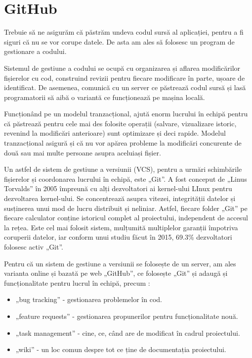 \section{GitHub}
	Trebuie să ne asigurăm că păstrăm undeva codul sursă al aplicației, pentru a fi siguri că nu se vor corupe datele.
	De asta am ales să folosesc un program de gestionare a codului.\cite{mercurial}

	Sistemul de gestiune a codului se ocupă cu organizarea și aflarea modificărilor fișierelor cu cod, construind revizii pentru fiecare modificare în parte, ușoare de identificat.
	De asemenea, comunică cu un server ce păstrează codul sursă și lasă programatorii să aibă o variantă ce funcționează pe mașina locală.

	Funcționând pe un modelul tranzacțional, ajută enorm lucrului în echipă pentru că păstrează pentru cele mai des folosite operații (salvare, vizualizare istoric, revenind la modificări anterioare) sunt optimizare și deci rapide.
	Modelul tranzacțional asigură și că nu vor apărea probleme la modificări concurente de două sau mai multe persoane asupra aceluiași fișier.

	Un astfel de sistem de gestiune a versiunii (VCS), pentru a urmări schimbările fișierelor și coordonarea lucrului în echipă, este „Git”.\cite{git}
	A fost conceput de „Linus Torvalds” în 2005 împreună cu alți dezvoltatori ai kernel-ului LInux pentru dezvoltarea kernel-ului.
	Se concentrează asupra vitezei, integrității datelor și susținerea unui mod de lucru distribuit și neliniar.
	Astfel, fiecare folder „Git” pe fiecare calculator conține istoricul complet al proiectului, independent de accesul la rețea.
	Este cel mai folosit sistem, mulțumită multiplelor garanții împotriva coruperii datelor, iar conform unui studiu făcut în 2015, 69.3\% dezvoltatori folosesc activ „Git”.

	Pentru că un sistem de gestiune a versiunii se folosește de un server, am ales varianta online și bazată pe web „GitHub”, ce folosește „Git” și adaugă și funcționalitate pentru lucrul în echipă, precum \cite{github} :
	\begin{itemize}
		\item „bug tracking” - gestionarea problemelor în cod.
		\item „feature requests” - gestionarea propunerilor pentru funcționalitate nouă.
		\item „task management” - cine, ce, când are de modificat în cadrul proiectului.
		\item „wiki” - un loc comun despre tot ce ține de documentația proiectului.
	\end{itemize}
